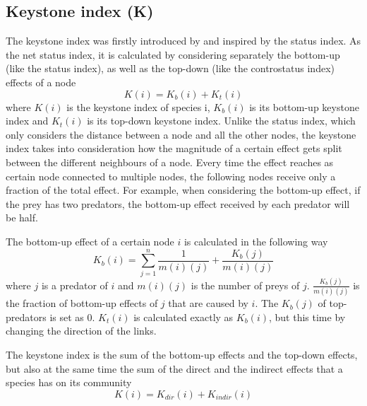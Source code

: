 \documentclass[twocolumn]{article}
\begin{document}
    \subsection*{Keystone index (K)}
        The keystone index was firstly introduced by \citet{Jordan1999} and inspired by the status index. 
        As the net status index, it is calculated by considering separately the bottom-up (like the status index), as well as the top-down (like the controstatus index) effects of a node \citep{Jordan2006}
        \begin{equation}
            K(i)=K_{b}(i)+K_{t}(i)
        \end{equation}
        where $K(i)$ is the keystone index of species i, $K_b(i)$ is its bottom-up keystone index and $K_t(i)$ is its top-down keystone index. 
        Unlike the status index, which only considers the distance between a node and all the other nodes, the keystone index takes into consideration how the magnitude of a certain effect gets split between the different neighbours of a node. Every time the effect reaches as certain node connected to multiple nodes, the following nodes receive only a fraction of the total effect. For example, when considering the bottom-up effect, if the prey has two predators, the bottom-up effect received by each predator will be half. 
        \par The bottom-up effect of a certain node $i$ is calculated in the following way
        \begin{equation}
            K_b(i)=\sum\limits_{j=1}^n\frac{1}{m(i)(j)}+\frac{K_b(j)}{m(i)(j)}
        \end{equation} where $j$ is a predator of $i$ and $m(i)(j)$ is the number of preys of $j$. $\frac{K_b(j)}{m(i)(j)}$ is the fraction of bottom-up effects of $j$ that are caused by $i$. The $K_b(j)$ of top-predators is set as 0. $K_t(i)$ is calculated exactly as $K_b(i)$, but this time by changing the direction of the links. 
        
        
        \par The keystone index is the sum of the bottom-up effects and the top-down effects, but also at the same time the sum of the direct and the indirect effects that a species has on its community %
        \begin{equation}
            K(i)=K_{dir}(i)+K_{indir}(i)
        \end{equation}
\end{document}

